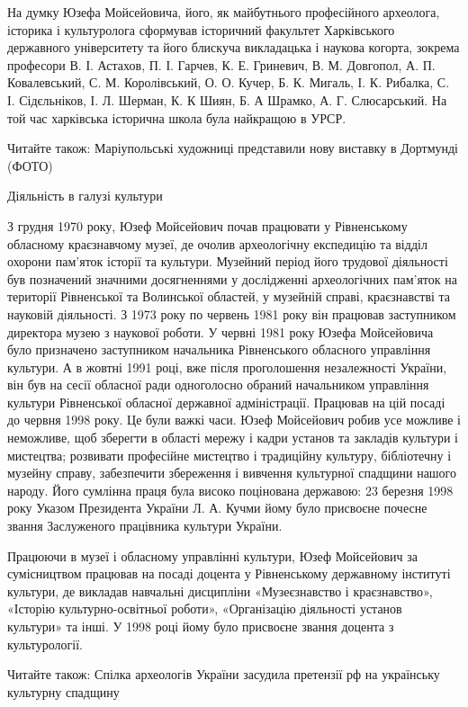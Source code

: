 На думку Юзефа Мойсейовича, його, як майбутнього професійного археолога,
історика і культуролога сформував історичний факультет Харківського державного
університету та його блискуча викладацька і наукова когорта, зокрема професори
В. І. Астахов, П. І. Гарчев, К. Е. Гриневич, В. М. Довгопол, А. П.
Ковалевський, С. М. Королівський, О. О. Кучер, Б. К. Мигаль, І. К. Рибалка, С.
І. Сідєльніков, І. Л. Шерман, К. К Шиян, Б. А Шрамко, А. Г. Слюсарський. На той
час харківська історична школа була найкращою в УРСР.

Читайте також: Маріупольські художниці представили нову виставку в Дортмунді
(ФОТО)

Діяльність в галузі культури

З грудня 1970 року, Юзеф Мойсейович почав працювати у Рівненському обласному
краєзнавчому музеї, де очолив археологічну експедицію та відділ охорони
пам’яток історії та культури. Музейний період його трудової діяльності був
позначений значними досягненнями у дослідженні археологічних пам’яток на
території Рівненської та Волинської областей, у музейній справі, краєзнавстві
та науковій діяльності. З 1973 року по червень 1981 року він працював
заступником директора музею з наукової роботи. У червні 1981 року Юзефа
Мойсейовича було призначено заступником начальника Рівненського обласного
управління культури. А в жовтні 1991 році, вже після проголошення незалежності
України, він був на сесії обласної ради одноголосно обраний начальником
управління культури Рівненської обласної державної адміністрації. Працював на
цій посаді до червня 1998 року. Це були важкі часи. Юзеф Мойсейович робив усе
можливе і неможливе, щоб зберегти в області мережу і кадри установ та закладів
культури і мистецтва; розвивати професійне мистецтво і традиційну культуру,
бібліотечну і музейну справу, забезпечити збереження і вивчення культурної
спадщини нашого народу. Його сумлінна праця була високо поцінована державою: 23
березня 1998 року Указом Президента України Л. А. Кучми йому було присвоєне
почесне звання Заслуженого працівника культури України.

Працюючи в музеї і обласному управлінні культури, Юзеф Мойсейович за
сумісництвом працював на посаді доцента у Рівненському державному інституті
культури, де викладав навчальні дисципліни «Музеєзнавство і краєзнавство»,
«Історію культурно-освітньої роботи», «Організацію діяльності установ культури»
та інші. У 1998 році йому було присвоєне звання доцента з культурології.

Читайте також: Спілка археологів України засудила претензії рф на українську
культурну спадщину


